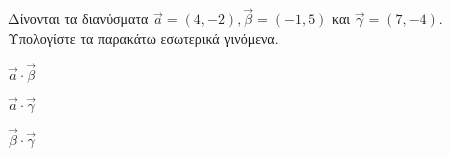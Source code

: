 Δίνονται τα διανύσματα $ \vec{a}=(4,-2),\vec{\beta}=(-1,5) $ και $ \vec{\gamma}=(7,-4) $. Υπολογίστε τα παρακάτω εσωτερικά γινόμενα.
\begin{multicols}{3}
\begin{alist}
\item $ \vec{a}\cdot\vec{\beta} $
\item $ \vec{a}\cdot\vec{\gamma} $
\item $ \vec{\beta}\cdot\vec{\gamma} $
\end{alist}
\end{multicols}
